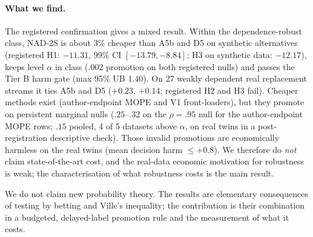 \paragraph{What we find.} The registered confirmation gives a mixed result. Within the
dependence-robust class, NAD-2S is about $3\%$ cheaper than A5b and D5 on synthetic alternatives
(registered H1: $-11.31$, 99\% CI $[-13.79,-8.84]$; H3 on synthetic data: $-12.17$), keeps level
$\alpha$ in class ($.002$ promotion on both registered nulls) and passes the Tier B harm gate
(max 95\% UB $1.40$). On 27 weakly dependent real replacement streams it ties A5b and D5 ($+0.23$,
$+0.14$; registered H2 and H3 fail). Cheaper methods exist (author-endpoint MOPE and V1
front-loaders), but they promote on persistent marginal nulls ($.25$--$.32$ on the $\rho=.95$ null for
the author-endpoint MOPE rows; $.15$ pooled, 4 of 5 datasets above $\alpha$, on real twins in a
post-registration descriptive check). Those invalid promotions are economically harmless on the real
twins (mean decision harm $\le+0.8$). We therefore do \emph{not} claim state-of-the-art cost, and the
real-data economic motivation for robustness is weak; the characterisation of what robustness costs
is the main result.

We do not claim new probability theory. The results are elementary consequences of testing by
betting and Ville's inequality; the contribution is their combination in a budgeted, delayed-label
promotion rule and the measurement of what it costs.
